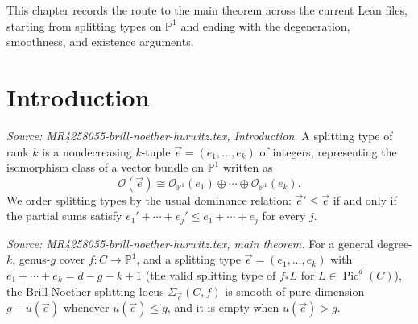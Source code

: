 This chapter records the route to the main theorem across the current Lean files, starting from splitting types on \(\mathbb P^1\) and ending with the degeneration, smoothness, and existence arguments.

\section{Introduction}

\begin{definition}
  \label{def:splitting-type}
  \textit{Source: MR4258055-brill-noether-hurwitz.tex, Introduction.}
  A splitting type of rank \(k\) is a nondecreasing \(k\)-tuple \(\vec e=(e_1,\dots,e_k)\) of integers, representing the isomorphism class of a vector bundle on \(\mathbb P^1\) written as
  \[
  \mathcal O(\vec e)\cong \mathcal O_{\mathbb P^1}(e_1)\oplus\cdots\oplus \mathcal O_{\mathbb P^1}(e_k).
  \]
  We order splitting types by the usual dominance relation: \(\vec e'\le \vec e\) if and only if the partial sums satisfy
  \(e_1'+\cdots+e_j'\le e_1+\cdots+e_j\) for every \(j\).
\end{definition}

\begin{theorem}
  \label{thm:main}
  \textit{Source: MR4258055-brill-noether-hurwitz.tex, main theorem.}
  For a general degree-\(k\), genus-\(g\) cover \(f:C\to\mathbb P^1\), and a splitting type \(\vec e=(e_1,\dots,e_k)\) with \(e_1+\cdots+e_k=d-g-k+1\) (the valid splitting type of \(f_*L\) for \(L\in\operatorname{Pic}^d(C)\)), the Brill-Noether splitting locus \(\Sigma_{\vec e}(C,f)\) is smooth of pure dimension \(g-u(\vec e)\) whenever \(u(\vec e)\le g\), and it is empty when \(u(\vec e)>g\).
\end{theorem}

